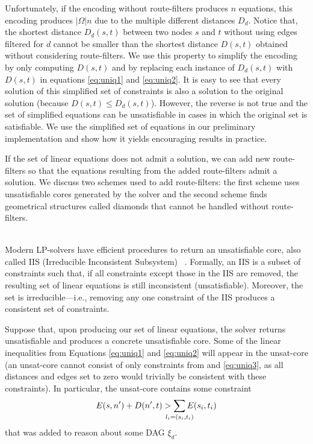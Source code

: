 Unfortunately, if the encoding without route-filters produces $n$ equations, this encoding produces $|\Omega|n$ due
to the multiple different distances $D_d$.
Notice that, the shortest distance $D_d(s,t)$ between two nodes $s$ and $t$ without using edges filtered for $d$ cannot be
smaller than the shortest distance $D(s,t)$ obtained without considering route-filters.
We use this property to simplify the encoding by only computing $D(s,t)$ and by replacing each instance of $D_d(s,t)$
with $D(s,t)$ in
equations \eqref{eq:uniq1} and \eqref{eq:uniq2}. 
It is easy to see that every solution of this simplified set of constraints
is also a solution to the original solution (because $D(s,t)\leq D_d(s,t)$).
However, the reverse is not true and the set of simplified equations can be unsatisfiable
in cases in which the original set is satisfiable.
We use the simplified
set of equations in our preliminary implementation and show how it yields encouraging results in practice.

If the set of linear equations does not admit a solution, we 
can add new route-filters so that the equations resulting from the added
route-filters admit a solution.
We discuss two schemes used to add route-filters:
the first scheme uses unsatisfiable cores generated
by the solver and the second scheme 
finds geometrical structures called diamonds that 
cannot be handled without route-filters.



 \\
Modern LP-solvers have efficient procedures to return an
unsatisfiable core, also called IIS (Irreducible Inconsistent Subsystem)
~\cite{chinneck2007feasibility}. Formally, an IIS is a subset of constraints such that,
if all constraints except those in the IIS are removed, the resulting set of
linear equations is still inconsistent (unsatisfiable). Moreover, the set is irreducible---i.e., removing 
any one constraint of the IIS produces a consistent set of constraints. 

Suppose that, upon producing our set of linear equations, the solver returns unsatisfiable and produces
a concrete unsatisfiable core. 
Some of the linear inequalities from 
Equations \eqref{eq:uniq1} and  \eqref{eq:uniq2}
will appear in the unsat-core 
(an unsat-core cannot consist of only 
constraints from  and \eqref{eq:uniq3}, as all distances and edges set to zero
would trivially be consistent with these constraints). 
In particular, the unsat-core contains some constraint
\begin{eqnarray}
E(s, n') + D(n', t) > \sum_{\mathclap{\substack{l_i=(s_i,t_i)}}} 
		E(s_i, t_i) 
\end{eqnarray}
that was added to reason about some DAG $\xi_d$.

